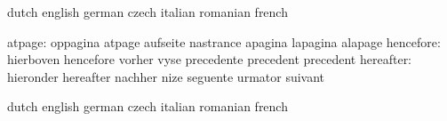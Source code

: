 
\startvariables            dutch                     english
                           german                    czech
                           italian                   romanian
                           french

                   atpage: oppagina                  atpage
                           aufseite                  nastrance
                           apagina                   lapagina
                           alapage
                hencefore: hierboven                 hencefore
                           vorher                    vyse
                           precedente                precedent
                           precedent
                hereafter: hieronder                 hereafter
                           nachher                   nize
                           seguente                  urmator
                           suivant

\stopvariables




\startvariables            dutch                     english
                           german                    czech
                           italian                   romanian
                           french

